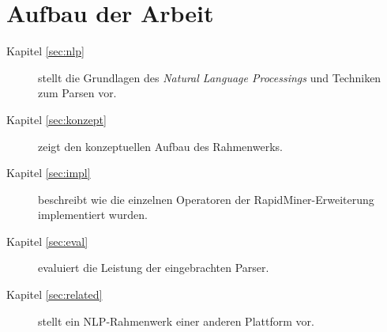 \section{Aufbau der Arbeit}
\begin{description}
\item[Kapitel \ref{sec:nlp}] stellt die Grundlagen des \textit{Natural Language Processings} und Techniken zum Parsen vor.
\item[Kapitel \ref{sec:konzept}] zeigt den konzeptuellen Aufbau des Rahmenwerks.
\item[Kapitel \ref{sec:impl}] beschreibt wie die einzelnen Operatoren der RapidMiner-Erweiterung implementiert wurden.
\item[Kapitel \ref{sec:eval}] evaluiert die Leistung der eingebrachten Parser.
\item[Kapitel \ref{sec:related}] stellt ein NLP-Rahmenwerk einer anderen Plattform vor.
\end{description}